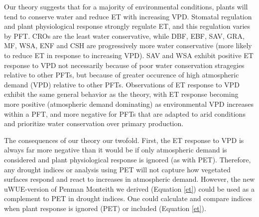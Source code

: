 \documentclass[draft,linenumbers]{agujournal}
\begin{document}
Our theory suggests that for a majority of environmental conditions,
plants will tend to conserve water and reduce ET with increasing
VPD. Stomatal regulation and plant physiological response strongly
regulate ET, and this regulation varies by PFT. CROs are the least
water conservative, while DBF, EBF, SAV, GRA, MF, WSA, ENF and CSH are
progressively more water conservative (more likely to reduce ET in
response to increasing VPD). SAV and WSA exhibit positive ET response
to VPD not necessarily because of poor water conservation stragegies
relative to other PFTs, but because of greater occurence of high
atmospheric demand (VPD) relative to other PFTs. Observations of ET
response to VPD exhibit the same general behavior as the theory, with
ET response becoming more positive (atmospheric demand dominating) as
environmental VPD increases within a PFT, and more negative for PFTs
that are adapted to arid conditions and prioritize water conservation
over primary production.

The consequences of our theory our twofold. First, the ET response to
VPD is always far more negative than it would be if only atmospheric
demand is considered and plant physiological response is ignored (as
with PET). Therefore, any drought indices or analysis using PET will
not capture how vegetated surfaces respond and react to increases in
atmospheric demand. However, the new uWUE-version of Penman Monteith
we derived (Equation \ref{et}) could be used as a complement to PET in
drought indices. One could calculate and compare indices when plant
response is ignored (PET) or included (Equation \ref{et}).
\end{document}
